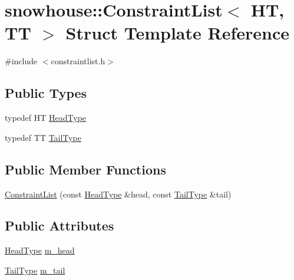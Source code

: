\hypertarget{structsnowhouse_1_1ConstraintList}{}\section{snowhouse\+::Constraint\+List$<$ HT, TT $>$ Struct Template Reference}
\label{structsnowhouse_1_1ConstraintList}


{\ttfamily \#include $<$constraintlist.\+h$>$}

\subsection*{Public Types}
\begin{DoxyCompactItemize}
\item 
typedef HT \mbox{\hyperlink{structsnowhouse_1_1ConstraintList_ad278fa7aa3ea2ba58869dd4b8ed542bc}{Head\+Type}}
\item 
typedef TT \mbox{\hyperlink{structsnowhouse_1_1ConstraintList_adf892be082855aa10589d067cee68780}{Tail\+Type}}
\end{DoxyCompactItemize}
\subsection*{Public Member Functions}
\begin{DoxyCompactItemize}
\item 
\mbox{\hyperlink{structsnowhouse_1_1ConstraintList_ad10084ab1dbabebd35c576676d65caea}{Constraint\+List}} (const \mbox{\hyperlink{structsnowhouse_1_1ConstraintList_ad278fa7aa3ea2ba58869dd4b8ed542bc}{Head\+Type}} \&head, const \mbox{\hyperlink{structsnowhouse_1_1ConstraintList_adf892be082855aa10589d067cee68780}{Tail\+Type}} \&tail)
\end{DoxyCompactItemize}
\subsection*{Public Attributes}
\begin{DoxyCompactItemize}
\item 
\mbox{\hyperlink{structsnowhouse_1_1ConstraintList_ad278fa7aa3ea2ba58869dd4b8ed542bc}{Head\+Type}} \mbox{\hyperlink{structsnowhouse_1_1ConstraintList_a95613a2db0d7ed3d6009e601c970fcd3}{m\+\_\+head}}
\item 
\mbox{\hyperlink{structsnowhouse_1_1ConstraintList_adf892be082855aa10589d067cee68780}{Tail\+Type}} \mbox{\hyperlink{structsnowhouse_1_1ConstraintList_af8d568d7aa57dc94a5945abe3989e55f}{m\+\_\+tail}}
\end{DoxyCompactItemize}


